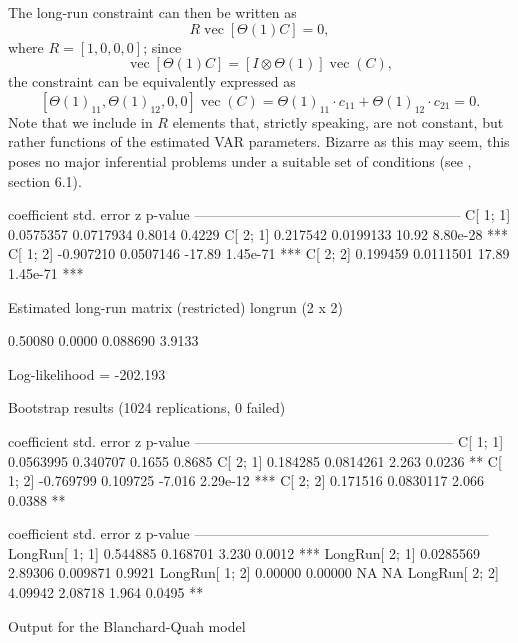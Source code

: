 \documentclass[a4paper,10pt]{article}
\DeclareMathOperator{\VEC}{\mathrm{vec}}
\begin{document}
The long-run constraint can then be written as
\begin{equation}
  \label{eq:BQlongrun}
  R \VEC[\Theta(1) C] = 0, 
\end{equation}
where $R = \left[ 1, 0, 0, 0 \right]$; since 
\[
  \VEC[\Theta(1) C] = [I \otimes \Theta(1)] \VEC(C), 
\]
the constraint can be equivalently expressed as
\begin{equation}
  \label{BQlongrun2}
  \left[ \Theta(1)_{11}, \Theta(1)_{12}, 0, 0 \right] \VEC(C) = 
  \Theta(1)_{11} \cdot c_{11} + \Theta(1)_{12} \cdot c_{21} = 0.
\end{equation}
Note that we include in $R$ elements that, strictly speaking, are not
constant, but rather functions of the estimated VAR parameters. Bizarre
as this may seem, this poses no major inferential problems under a
suitable set of conditions (see \cite{AG}, section 6.1).

\begin{table}[htbp]
\begin{scode}
             coefficient   std. error      z       p-value 
  ---------------------------------------------------------
  C[ 1; 1]    0.0575357    0.0717934      0.8014   0.4229  
  C[ 2; 1]    0.217542     0.0199133     10.92     8.80e-28 ***
  C[ 1; 2]   -0.907210     0.0507146    -17.89     1.45e-71 ***
  C[ 2; 2]    0.199459     0.0111501     17.89     1.45e-71 ***

Estimated long-run matrix (restricted)
longrun (2 x 2)

     0.50080       0.0000 
    0.088690       3.9133 

  Log-likelihood = -202.193
  
Bootstrap results (1024 replications, 0 failed)

             coefficient   std. error      z      p-value 
  --------------------------------------------------------
  C[ 1; 1]    0.0563995    0.340707      0.1655   0.8685  
  C[ 2; 1]    0.184285     0.0814261     2.263    0.0236   **
  C[ 1; 2]   -0.769799     0.109725     -7.016    2.29e-12 ***
  C[ 2; 2]    0.171516     0.0830117     2.066    0.0388   **


                   coefficient   std. error       z       p-value
  ---------------------------------------------------------------
  LongRun[ 1; 1]    0.544885      0.168701     3.230       0.0012 ***
  LongRun[ 2; 1]    0.0285569     2.89306      0.009871    0.9921
  LongRun[ 1; 2]    0.00000       0.00000     NA          NA     
  LongRun[ 2; 2]    4.09942       2.08718      1.964       0.0495 **
\end{scode}
  \caption{Output for the Blanchard-Quah model}
  \label{tab:BlQuahOutput}
\end{table}
\end{document}
